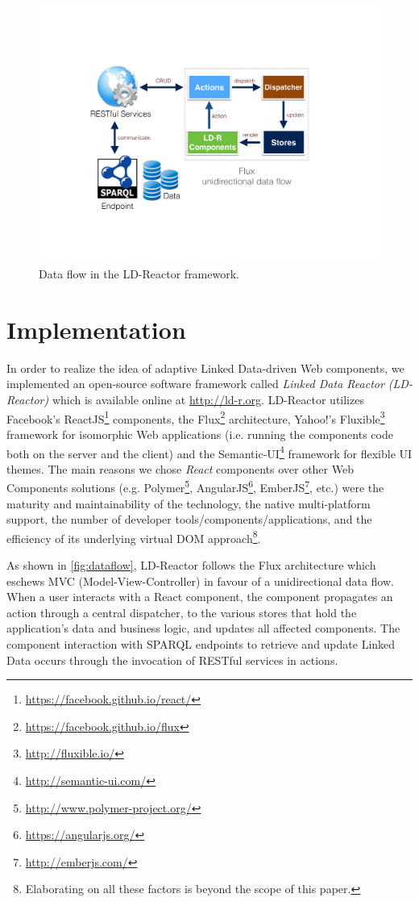 \documentclass{acm_proc_article-sp}
\begin{document}
\begin{figure}[tb]
\center
  \includegraphics[width=.9\linewidth]{images/dataflow.pdf}
  \caption{Data flow in the LD-Reactor framework.}
  \label{fig:dataflow}
\end{figure}

\section{Implementation}

In order to realize the idea of adaptive Linked Data-driven Web components, we implemented an open-source software framework called \emph{Linked Data Reactor (LD-Reactor)} which is available online at \url{http://ld-r.org}.
LD-Reactor utilizes Facebook's ReactJS\footnote{\url{https://facebook.github.io/react/}} components, the Flux\footnote{\url{https://facebook.github.io/flux}} architecture, Yahoo!'s Fluxible\footnote{\url{http://fluxible.io/}} framework for isomorphic Web applications (i.e. running the components code both on the server and the client) and the Semantic-UI\footnote{\url{http://semantic-ui.com/}} framework for flexible UI themes.
The main reasons we chose \emph{React} components over other  Web Components solutions (e.g. Polymer\footnote{\url{http://www.polymer-project.org/}}, AngularJS\footnote{\url{https://angularjs.org/}}, EmberJS\footnote{\url{http://emberjs.com/}}, etc.) were the maturity and maintainability of the technology, the native multi-platform support, the number of developer tools/components/applications, and the efficiency of its underlying virtual DOM approach\footnote{Elaborating on all these factors is beyond the scope of this paper.}.

As shown in \autoref{fig:dataflow}, LD-Reactor follows the Flux architecture which eschews MVC (Model-View-Controller) in favour of a unidirectional data flow. 
When a user interacts with a React component, the component propagates an action through a central dispatcher, to the various stores that hold the application's data and business logic, and updates all affected components. 
The component interaction with SPARQL endpoints to retrieve and update Linked Data occurs through the invocation of RESTful services in actions.
\end{document}
